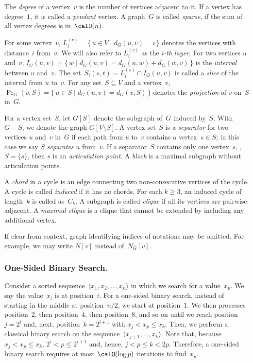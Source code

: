 The \emph{degree} of a vertex~$v$ is the number of vertices adjacent to it.
If a vertex has degree~$1$, it is called a \emph{pendant} vertex.
A graph~$G$ is called \emph{sparse}, if the sum of all vertex degrees is in~$\calO(n)$.

For some vertex~$v$, $L_i^{(v)} = \big \{ \, u \in V \mid d_G(u,v) = i \, \big \}$ denotes the vertices with distance~$i$ from~$v$.
We will also refer to $L_i^{(v)}$ as the \emph{\( i \)-th layer}.
For two vertices $u$ and~$v$, $I_G(u,v) = \{ \, w \mid d_G(u,v) = d_G(u,w) + d_G(w,v) \, \}$ is the \emph{interval} between $u$ and~$v$.
The set~$S_i(s,t) = L_i^{(s)} \cap I_G(u,v)$ is called a \emph{slice} of the interval from $u$ to~$v$.
For any set~$S \subseteq V$ and a vertex~$v$, $\Pr_G(v, S) = \big \{ \, u \in S \mid d_G(u, v) = d_G(v, S) \, \big \}$ denotes the \emph{projection} of $v$ on~$S$ in~$G$.

For a vertex set~$S$, let $G[S]$ denote the subgraph of~$G$ induced by~$S$.
With $G - S$, we denote the graph $G[V \setminus S]$.
A vertex set~$S$ is a \emph{separator} for two vertices $u$ and~$v$ in~$G$ if each path from $u$ to~$v$ contains a vertex~$s \in S$; in this case we say $S$ \emph{separates} $u$ from~$v$.
If a separator~$S$ contains only one vertex~$s$, \ie, $S = \{ s \}$, then $s$ is an \emph{articulation point}.
A \emph{block} is a maximal subgraph without articulation points.

A \emph{chord} in a cycle is an edge connecting two non-consecutive vertices of the cycle.
A cycle is called \emph{induced} if it has no chords.
For each $k \geq 3$, an induced cycle of length~$k$ is called as~$C_k$.
A subgraph is called \emph{clique} if all its vertices are pairwise adjacent.
A \emph{maximal clique} is a clique that cannot be extended by including any additional vertex.

If clear from context, graph identifying indices of notations may be omitted.
For example, we may write $N[v]$ instead of~$N_G[v]$.


\subsubsection{One-Sided Binary Search.}
Consider a sorted sequence~$\langle x_1, x_2, \ldots, x_{n} \rangle$ in which we search for a value~$x_p$.
We say the value~$x_i$ is at position~$i$.
For a one-sided binary search, instead of starting in the middle at position~$n/2$, we start at position~$1$.
We then processes position~$2$, then position~$4$, then position~$8$, and so on until we reach position~$j = 2^i$ and, next, position~$k = 2^{i+1}$ with $x_j < x_p \leq x_k$.
Then, we perform a classical binary search on the sequence~$\langle x_{j + 1}, \ldots, x_k \rangle$.
Note that, because $x_j < x_p \leq x_k$, $2^i < p \leq 2^{i+1}$ and, hence, $j < p \leq k < 2p$.
Therefore, a one-sided binary search requires at most $\calO(\log p)$ iterations to find~$x_p$.

